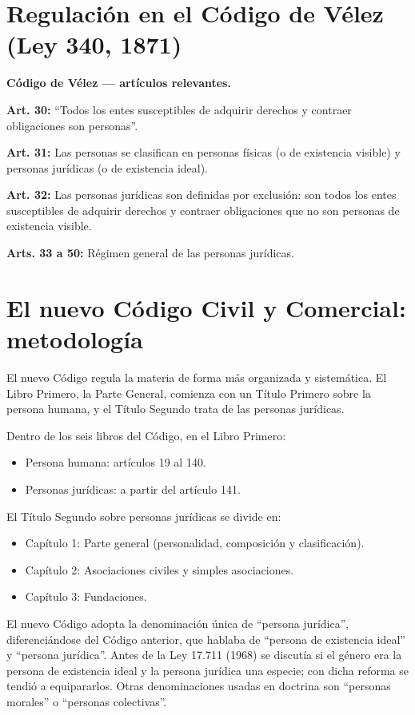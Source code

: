 \documentclass[12pt,oneside]{book}
\begin{document}
\section{Regulación en el Código de Vélez (Ley 340, 1871)}

\begin{note}
\textbf{Código de Vélez --- artículos relevantes.}

\textbf{Art. 30:} ``Todos los entes susceptibles de adquirir derechos y contraer obligaciones son personas''.

\textbf{Art. 31:} Las personas se clasifican en personas físicas (o de existencia visible) y personas jurídicas (o de existencia ideal).

\textbf{Art. 32:} Las personas jurídicas son definidas por exclusión: son todos los entes susceptibles de adquirir derechos y contraer obligaciones que no son personas de existencia visible.

\textbf{Arts. 33 a 50:} Régimen general de las personas jurídicas.
\end{note}

\section{El nuevo Código Civil y Comercial: metodología}

El nuevo Código regula la materia de forma más organizada y sistemática. El Libro Primero, la Parte General, comienza con un Título Primero sobre la persona humana, y el Título Segundo trata de las personas jurídicas.

Dentro de los seis libros del Código, en el Libro Primero:
\begin{itemize}
    \item Persona humana: artículos 19 al 140.
    \item Personas jurídicas: a partir del artículo 141.
\end{itemize}

El Título Segundo sobre personas jurídicas se divide en:
\begin{itemize}
    \item Capítulo 1: Parte general (personalidad, composición y clasificación).
    \item Capítulo 2: Asociaciones civiles y simples asociaciones.
    \item Capítulo 3: Fundaciones.
\end{itemize}

\begin{note}
El nuevo Código adopta la denominación única de ``persona jurídica'', diferenciándose del Código anterior, que hablaba de ``persona de existencia ideal'' y ``persona jurídica''. Antes de la Ley 17.711 (1968) se discutía si el género era la persona de existencia ideal y la persona jurídica una especie; con dicha reforma se tendió a equipararlos. Otras denominaciones usadas en doctrina son ``personas morales'' o ``personas colectivas''.
\end{note}
\end{document}
